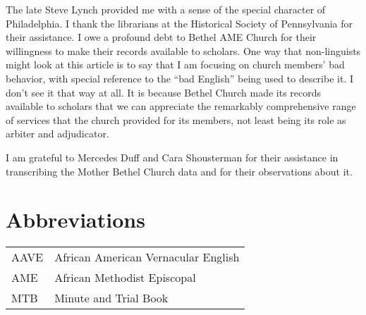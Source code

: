 \documentclass[output=paper,colorlinks,citecolor=brown]{langscibook}
\begin{document}
The late Steve Lynch provided me with a sense of the special character of Philadelphia. I thank the librarians at the Historical Society of Pennsylvania for their assistance. I owe a profound debt to Bethel AME Church for their willingness to make their records available to scholars. One way that non-linguists might look at this article is to say that I am focusing on church members’ bad behavior, with special reference to the “bad English” being used to describe it. I don’t see it that way at all. It is because Bethel Church made its records available to scholars that we can appreciate the remarkably comprehensive range of services that the church provided for its members, not least being its role as arbiter and adjudicator. 

I am grateful to Mercedes Duff and Cara Shousterman for their assistance in transcribing the Mother Bethel Church data and for their observations about it.

\section*{Abbreviations}
\begin{tabularx}{\textwidth}{@{}lQ@{}}
\textsc{AAVE} & African American Vernacular English  \\
\textsc{AME} & African Methodist Episcopal\\
\textsc{MTB} & Minute and Trial Book \\
\end{tabularx}

{\sloppy\printbibliography[heading=subbibliography,notkeyword=this]}
\end{document}
